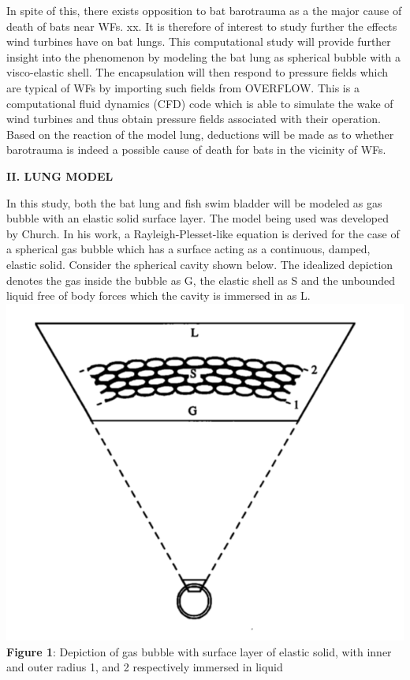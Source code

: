 \documentclass{article}
\begin{document}
\begin{multicols}{2}
In spite of this, there exists opposition to bat barotrauma as a the major cause of death of bats near WFs. xx. It is therefore of interest to study further the effects wind turbines have on bat lungs. This computational study will provide further insight into the phenomenon by modeling the bat lung as spherical bubble with a visco-elastic shell. The encapsulation will then respond to pressure fields which are typical of WFs by importing such fields from OVERFLOW. This is a computational fluid dynamics (CFD) code which is able to simulate the wake of wind turbines and thus obtain pressure fields associated with their operation. Based on the reaction of the model lung, deductions will be made as to whether barotrauma is indeed a possible cause of death for bats in the vicinity of WFs. 

\vspace{25cm}
\noindent\textbf{II. LUNG MODEL}

\vspace{0.1cm}
In this study, both the bat lung and fish swim bladder will be modeled as gas bubble with an elastic solid surface layer. The model being used was developed by Church. In his work, a Rayleigh-Plesset-like equation is derived for the case of a spherical gas bubble which has a surface acting as a continuous, damped, elastic solid. Consider the spherical cavity shown below. The idealized depiction denotes the gas inside the bubble as G, the elastic shell as S and the unbounded liquid free of body forces which the cavity is immersed in as L. \\

\hspace{1.8cm}\includegraphics[scale = 0.2]{Model_Bubble}\\
\small\textbf{Figure 1}: Depiction of gas bubble with surface layer of elastic solid, with inner and outer radius 1, and 2 respectively immersed in liquid
\normalsize


\end{multicols}
\end{document}
